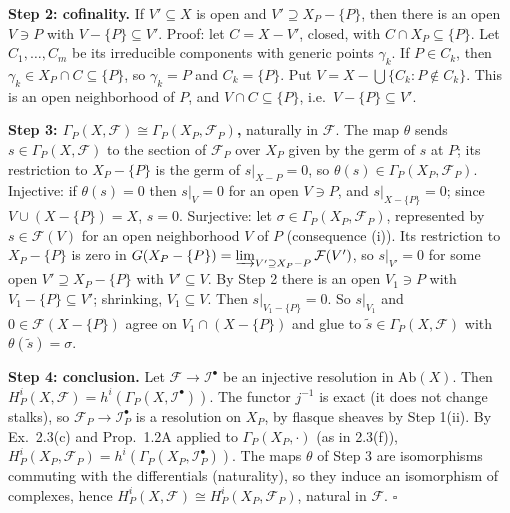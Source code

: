 \documentclass[11pt]{article}
\begin{document}
\textbf{Step 2: cofinality.} If $V'\subseteq X$ is open and $V'\supseteq X_P-\{P\}$, then there is an open $V\ni P$ with $V-\{P\}\subseteq V'$. Proof: let $C=X-V'$, closed, with $C\cap X_P\subseteq\{P\}$. Let $C_1,\dots,C_m$ be its irreducible components with generic points $\gamma_k$. If $P\in C_k$, then $\gamma_k\in X_P\cap C\subseteq\{P\}$, so $\gamma_k=P$ and $C_k=\{P\}$. Put $V=X-\bigcup\{C_k:P\notin C_k\}$. This is an open neighborhood of $P$, and $V\cap C\subseteq\{P\}$, i.e.\ $V-\{P\}\subseteq V'$.

\textbf{Step 3: $\Gamma_P(X,\mathcal F)\cong\Gamma_P(X_P,\mathcal F_P)$,} naturally in $\mathcal F$. The map $\theta$ sends $s\in\Gamma_P(X,\mathcal F)$ to the section of $\mathcal F_P$ over $X_P$ given by the germ of $s$ at $P$; its restriction to $X_P-\{P\}$ is the germ of $s|_{X-P}=0$, so $\theta(s)\in\Gamma_P(X_P,\mathcal F_P)$. Injective: if $\theta(s)=0$ then $s|_V=0$ for an open $V\ni P$, and $s|_{X-\{P\}}=0$; since $V\cup(X-\{P\})=X$, $s=0$. Surjective: let $\sigma\in\Gamma_P(X_P,\mathcal F_P)$, represented by $s\in\mathcal F(V)$ for an open neighborhood $V$ of $P$ (consequence (i)). Its restriction to $X_P-\{P\}$ is zero in $G(X_P-\{P\})=\varinjlim_{V'\supseteq X_P-P}\mathcal F(V')$, so $s|_{V'}=0$ for some open $V'\supseteq X_P-\{P\}$ with $V'\subseteq V$. By Step 2 there is an open $V_1\ni P$ with $V_1-\{P\}\subseteq V'$; shrinking, $V_1\subseteq V$. Then $s|_{V_1-\{P\}}=0$. So $s|_{V_1}$ and $0\in\mathcal F(X-\{P\})$ agree on $V_1\cap(X-\{P\})$ and glue to $\tilde s\in\Gamma_P(X,\mathcal F)$ with $\theta(\tilde s)=\sigma$.

\textbf{Step 4: conclusion.} Let $\mathcal F\to\mathcal I^\bullet$ be an injective resolution in $\mathrm{Ab}(X)$. Then $H^i_P(X,\mathcal F)=h^i(\Gamma_P(X,\mathcal I^\bullet))$. The functor $j^{-1}$ is exact (it does not change stalks), so $\mathcal F_P\to\mathcal I^\bullet_P$ is a resolution on $X_P$, by flasque sheaves by Step 1(ii). By Ex.~2.3(c) and Prop.~1.2A applied to $\Gamma_P(X_P,\cdot)$ (as in 2.3(f)), $H^i_P(X_P,\mathcal F_P)=h^i(\Gamma_P(X_P,\mathcal I^\bullet_P))$. The maps $\theta$ of Step 3 are isomorphisms commuting with the differentials (naturality), so they induce an isomorphism of complexes, hence $H^i_P(X,\mathcal F)\cong H^i_P(X_P,\mathcal F_P)$, natural in $\mathcal F$. \hfill$\square$
\end{document}

